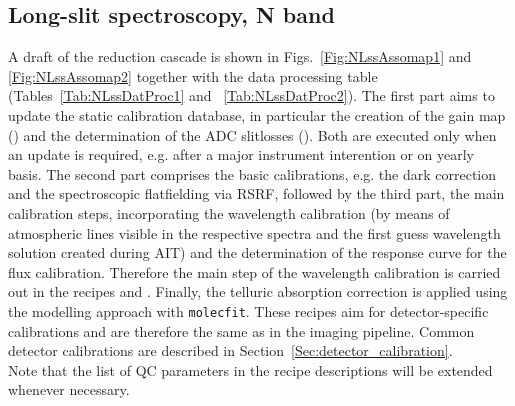\clearpage
\subsection{Long-slit spectroscopy, N band}
\label{ssec:recipes_lss_n}
A draft of the reduction cascade is shown in Figs.~\ref{Fig:NLssAssomap1} and \ref{Fig:NLssAssomap2} together with the data processing table (Tables~\ref{Tab:NLssDatProc1} and ~\ref{Tab:NLssDatProc2}). The first part aims to update the static calibration database, in particular the creation of the gain map (\hyperref[Sec:detector_calibration]{}) and the determination of the \ac{ADC} slitlosses (\hyperref[rec:metis_n_adc_slitloss]{}). Both are executed only when an update is required, e.g. after a major instrument interention or on yearly basis. The second part comprises the basic calibrations, e.g. the dark correction and the spectroscopic flatfielding via \ac{RSRF}, followed by the third part, the main calibration steps, incorporating the wavelength calibration (by means of atmospheric lines visible in the respective spectra and the first guess wavelength solution created during \ac{AIT}) and the determination of the response curve for the flux calibration. Therefore the main step of the wavelength calibration is carried out in the recipes \hyperref[rec:metis_n_lss_std]{} and \hyperref[rec:metis_lm_lss_sci]{}. Finally, the telluric absorption correction is applied using the modelling approach with \texttt{molecfit}.
These recipes aim for detector-specific calibrations and are therefore the same as in the imaging pipeline. Common detector calibrations are described in Section~\ref{Sec:detector_calibration}.\\
Note that the list of \ac{QC} parameters in the recipe descriptions will be extended whenever necessary.\\

